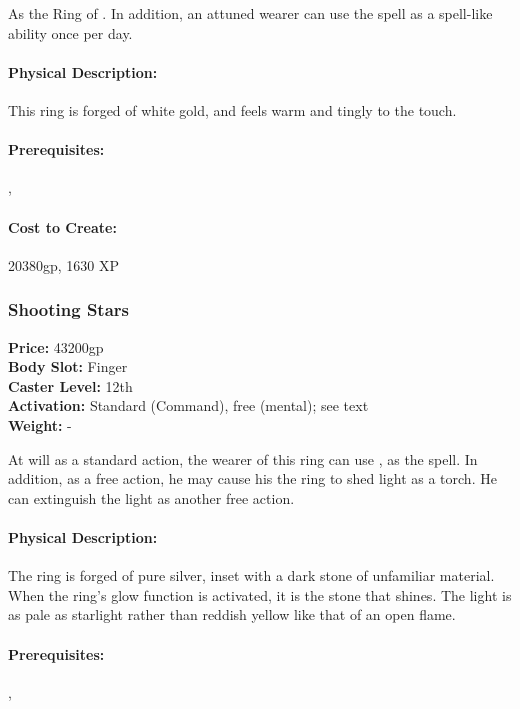 As the Ring of . In addition, an attuned wearer can use the  spell as a spell-like ability once per day.

\paragraph{Physical Description:} This ring is forged of white gold, and feels warm and tingly to the touch.

\paragraph{Prerequisites:} , 

\paragraph{Cost to Create:} 20380gp, 1630 XP
\subsubsection{Shooting Stars}
\label{Item:ShootingStars}
   \textbf{Price:} 43200gp
\\ \textbf{Body Slot:} Finger
\\ \textbf{Caster Level:} 12th
\\ \textbf{Activation:} Standard (Command), free (mental); see text
\\ \textbf{Weight:} -

At will as a standard action, the wearer of this ring can use , as the spell. In addition, as a free action, he may cause his the ring to shed light as a torch. He can extinguish the light as another free action.

\paragraph{Physical Description:} The ring is forged of pure silver, inset with a dark stone of unfamiliar material. When the ring's glow function is activated, it is the stone that shines. The light is as pale as starlight rather than reddish yellow like that of an open flame.

\paragraph{Prerequisites:} , 

